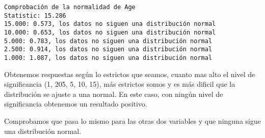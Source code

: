\documentclass[11pt]{article}
\begin{document}
    \begin{Verbatim}[commandchars=\\\{\}]
Comprobación de la normalidad de Age
Statistic: 15.286
15.000: 0.573, los datos no siguen una distribución normal
10.000: 0.653, los datos no siguen una distribución normal
5.000: 0.783, los datos no siguen una distribución normal
2.500: 0.914, los datos no siguen una distribución normal
1.000: 1.087, los datos no siguen una distribución normal
    \end{Verbatim}

    Obtenemos respuestas según lo estrictos que seamos, cuanto mas alto el
nivel de significancia (1, 205, 5, 10, 15), más estrictos somos y es más
dificil que la distribución se ajuste a una normal. En este caso, con
ningún nivel de significancia obtenemos un resultado positivo.

Comprobamos que pasa lo mismo para las otras dos variables y que ninguna
sigue una distribución normal.
\end{document}
